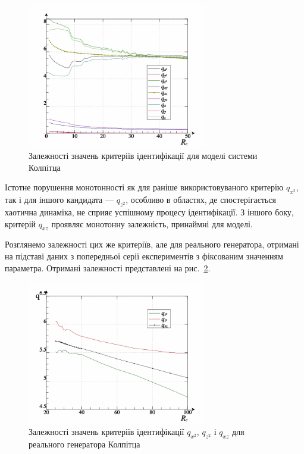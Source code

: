\begin{figure}[htb!]
\centerline{\includegraphics[width=0.7\textwidth]{p/colp_bjt_q-p_Rc_q.png} }
\caption{Залежності значень критеріїв ідентифікації для моделі системи Колпітца}
\label{atu:f:colp_bjt_q-p_Rc_q}
\end{figure}

Істотне порушення монотонності як для раніше використовуваного
критерію
$ q_{x^2} $, так і для іншого кандидата ---
$ q_{z^2} $, особливо в областях, де спостерігається хаотична
динаміка, не сприяє успішному процесу ідентифікації. З іншого
боку, критерій
$ q_{xz} $ проявляє монотонну залежність, принаймні для моделі.

Розглянемо залежності цих же критеріїв, але для реального
генератора, отримані на підставі даних з попередньої серії
експериментів з фіксованим значенням параметра. Отримані
залежності представлені на рис.~\ref{atu:f:colp_read_q-p_Rc_q-p_Rc_q}.


\begin{figure}[htb!]
\centerline{\includegraphics[width=0.7\textwidth]{p/colp_read_q-p_Rc_q.png} }
\caption{Залежності значень критеріїв ідентифікації $ q_{x ^ 2} $, $ q_{z ^ 2} $ і $ q_{xz} $ для реального генератора Колпітца}
\label{atu:f:colp_read_q-p_Rc_q-p_Rc_q}
\end{figure}

